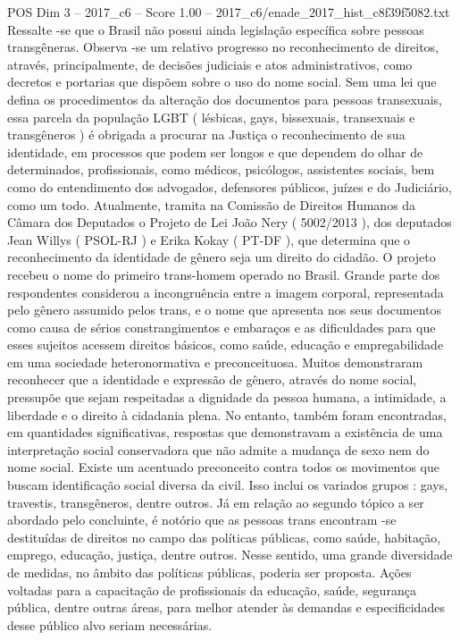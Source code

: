 \begin{textsample}{POS Dim 3 – 2017\_c6 – Score 1.00 – 2017\_c6/enade\_2017\_hist\_c8f39f5082.txt}
Ressalte -se que o Brasil não possui ainda legislação específica sobre pessoas transgêneras.
Observa -se um relativo progresso no reconhecimento de direitos, através, principalmente, de decisões judiciais e atos administrativos, como decretos e portarias que dispõem sobre o uso do nome social.
Sem uma lei que defina os procedimentos da alteração dos documentos para pessoas transexuais, essa parcela da população LGBT ( lésbicas, gays, bissexuais, transexuais e transgêneros ) é obrigada a procurar na Justiça o reconhecimento de sua identidade, em processos que podem ser longos e que dependem do olhar de determinados, profissionais, como médicos, psicólogos, assistentes sociais, bem como do entendimento dos advogados, defensores públicos, juízes e do Judiciário, como um todo.
Atualmente, tramita na Comissão de Direitos Humanos da Câmara dos Deputados o Projeto de Lei João Nery ( 5002/2013 ), dos deputados Jean Willys ( PSOL-RJ ) e Erika Kokay ( PT-DF ), que determina que o reconhecimento da identidade de gênero seja um direito do cidadão.
O projeto recebeu o nome do primeiro trans-homem operado no Brasil.
Grande parte dos respondentes considerou a incongruência entre a imagem corporal, representada pelo gênero assumido pelos trans, e o nome que apresenta nos seus documentos como causa de sérios constrangimentos e embaraços e as dificuldades para que esses sujeitos acessem direitos básicos, como saúde, educação e empregabilidade em uma sociedade heteronormativa e preconceituosa.
Muitos demonstraram reconhecer que a identidade e expressão de gênero, através do nome social, pressupõe que sejam respeitadas a dignidade da pessoa humana, a intimidade, a liberdade e o direito à cidadania plena.
No entanto, também foram encontradas, em quantidades significativas, respostas que demonstravam a existência de uma interpretação social conservadora que não admite a mudança de sexo nem do nome social.
Existe um acentuado preconceito contra todos os movimentos que buscam identificação social diversa da civil.
Isso inclui os variados grupos : gays, travestis, transgêneros, dentre outros.
Já em relação ao segundo tópico a ser abordado pelo concluinte, é notório que as pessoas trans encontram -se destituídas de direitos no campo das políticas públicas, como saúde, habitação, emprego, educação, justiça, dentre outros.
Nesse sentido, uma grande diversidade de medidas, no âmbito das políticas públicas, poderia ser proposta.
Ações voltadas para a capacitação de profissionais da educação, saúde, segurança pública, dentre outras áreas, para melhor atender às demandas e especificidades desse público alvo seriam necessárias.

\end{textsample}
